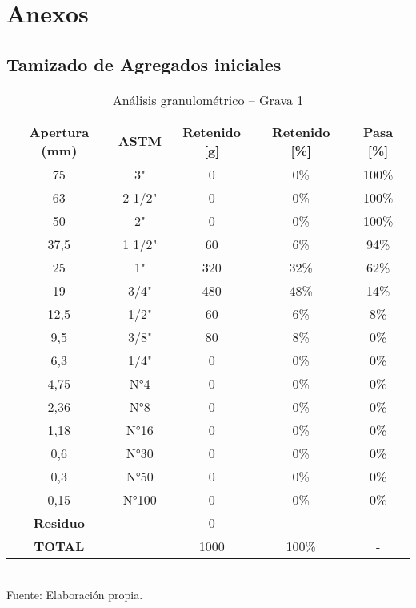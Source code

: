 \section{Anexos}

\subsection{Tamizado de Agregados iniciales}

\begin{table}[H]
\centering
\caption{Análisis granulométrico – Grava 1}
\label{tab:grava1}
\small
\begin{tabular}{|c|c|c|c|c|}
\hline
\textbf{Apertura (mm)} & \textbf{ASTM} & \textbf{Retenido [g]} & \textbf{Retenido [\%]} & \textbf{Pasa [\%]} \\ \hline
75   & 3"      & 0   & 0\%  & 100\% \\ \hline
63   & 2 1/2"  & 0   & 0\%  & 100\% \\ \hline
50   & 2"      & 0   & 0\%  & 100\% \\ \hline
37,5 & 1 1/2"  & 60  & 6\%  & 94\%  \\ \hline
25   & 1"      & 320 & 32\% & 62\%  \\ \hline
19   & 3/4"    & 480 & 48\% & 14\%  \\ \hline
12,5 & 1/2"    & 60  & 6\%  & 8\%   \\ \hline
9,5  & 3/8"    & 80  & 8\%  & 0\%   \\ \hline
6,3  & 1/4"    & 0   & 0\%  & 0\%   \\ \hline
4,75 & N°4     & 0   & 0\%  & 0\%   \\ \hline
2,36 & N°8     & 0   & 0\%  & 0\%   \\ \hline
1,18 & N°16    & 0   & 0\%  & 0\%   \\ \hline
0,6  & N°30    & 0   & 0\%  & 0\%   \\ \hline
0,3  & N°50    & 0   & 0\%  & 0\%   \\ \hline
0,15 & N°100   & 0   & 0\%  & 0\%   \\ \hline
\textbf{Residuo} &     & 0   & -    & -     \\ \hline
\textbf{TOTAL}  &     & 1000& 100\%& -     \\ \hline
\end{tabular}
\\ Fuente: Elaboración propia.
\end{table}


